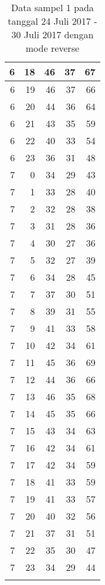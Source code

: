\begin{longtable}{|r|r|r|r|r|}
    \hline
    6     & 18    & 46    & 37    & 67 \\
    \hline
    6     & 19    & 46    & 37    & 66 \\
    \hline
    6     & 20    & 44    & 36    & 64 \\
    \hline
    6     & 21    & 43    & 35    & 59 \\
    \hline
    6     & 22    & 40    & 33    & 54 \\
    \hline
    6     & 23    & 36    & 31    & 48 \\
    \hline
    7     & 0     & 34    & 29    & 43 \\
    \hline
    7     & 1     & 33    & 28    & 40 \\
    \hline
    7     & 2     & 32    & 28    & 38 \\
    \hline
    7     & 3     & 31    & 28    & 36 \\
    \hline
    7     & 4     & 30    & 27    & 36 \\
    \hline
    7     & 5     & 32    & 27    & 39 \\
    \hline
    7     & 6     & 34    & 28    & 45 \\
    \hline
    7     & 7     & 37    & 30    & 51 \\
    \hline
    7     & 8     & 39    & 31    & 55 \\
    \hline
    7     & 9     & 41    & 33    & 58 \\
    \hline
    7     & 10    & 42    & 34    & 61 \\
    \hline
    7     & 11    & 45    & 36    & 69 \\
    \hline
    7     & 12    & 44    & 36    & 66 \\
    \hline
    7     & 13    & 46    & 35    & 68 \\
    \hline
    7     & 14    & 45    & 35    & 66 \\
    \hline
    7     & 15    & 43    & 34    & 63 \\
    \hline
    7     & 16    & 42    & 34    & 61 \\
    \hline
    7     & 17    & 42    & 34    & 59 \\
    \hline
    7     & 18    & 41    & 33    & 59 \\
    \hline
    7     & 19    & 41    & 33    & 57 \\
    \hline
    7     & 20    & 40    & 32    & 56 \\
    \hline
    7     & 21    & 37    & 31    & 51 \\
    \hline
    7     & 22    & 35    & 30    & 47 \\
    \hline
    7     & 23    & 34    & 29    & 44 \\
    \hline
		\caption{Data sampel 1 pada tanggal 24 Juli 2017 - 30 Juli 2017 dengan mode reverse}
  \label{tab:datasample124072017reverse}%
\end{longtable}%

